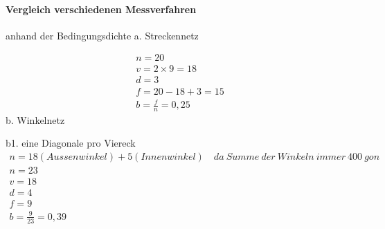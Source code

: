 \documentclass[12pt]{article}
\begin{document}
\paragraph{Vergleich verschiedenen Messverfahren}
\noindent anhand der Bedingungsdichte 
a. Streckennetz
\begin{figure}[ht]\centering
\end{figure}
\begin{gather*}
n = 20\\
v = 2 \times 9 = 18\\
d = 3\\
f = 20 - 18 + 3 = 15\\
b = \frac{f}{n} = 0,25
\end{gather*}
b. Winkelnetz
\begin{figure}[ht]\centering
\end{figure}
\newline
b1. eine Diagonale pro Viereck
\begin{gather*}
n = 18(Aussenwinkel) + 5(Innenwinkel)\quad da\ Summe\ der\ Winkeln\ immer\ 400\ gon\\
n = 23\\
v = 18\\
d = 4\\
f = 9\\
b = \frac{9}{23} = 0,39
\end{gather*}
\end{document}

